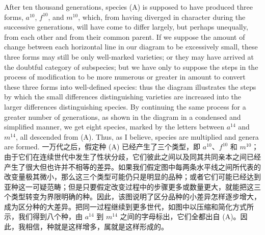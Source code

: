 \darwinpair
{After ten thousand generations, species (A) is supposed to have produced three forms, $a^{10}$, $f^{10}$, and $m^{10}$, which, from having diverged in character during the successive generations, will have come to differ largely, but perhaps unequally, from each other and from their common parent. If we suppose the amount of change between each horizontal line in our diagram to be excessively small, these three forms may still be only well-marked varieties; or they may have arrived at the doubtful category of subspecies; but we have only to suppose the steps in the process of modification to be more numerous or greater in amount to convert these three forms into well-defined species: thus the diagram illustrates the steps by which the small differences distinguishing varieties are increased into the larger differences distinguishing species. By continuing the same process for a greater number of generations, as shown in the diagram in a condensed and simplified manner, we get eight species, marked by the letters between $a^{14}$ and $m^{14}$, all descended from (A). Thus, as I believe, species are multiplied and genera are formed.}
{一万代之后，假定种 (A) 已经产生了三个类型，即 $a^{10}$、$f^{10}$ 和 $m^{10}$；由于它们在连续世代中发生了性状分歧，它们彼此之间以及同其共同亲本之间已经产生了很大但也许并不相等的差异。如果我们假定图中每两条水平线之间所代表的改变量极其微小，那么这三个类型可能仍只是明显的品种；或者它们可能已经达到亚种这一可疑范畴；但是只要假定改变过程中的步骤更多或数量更大，就能把这三个类型转变为界限明确的种。因此，该图说明了区分品种的小差异怎样逐步增大，成为区分种的大差异。把同一过程继续到更多世代，如图中以压缩和简化方式所示，我们得到八个种，由 $a^{14}$ 到 $m^{14}$ 之间的字母标出，它们全都出自 (A)。因此，我相信，种就是这样增多，属就是这样形成的。}

